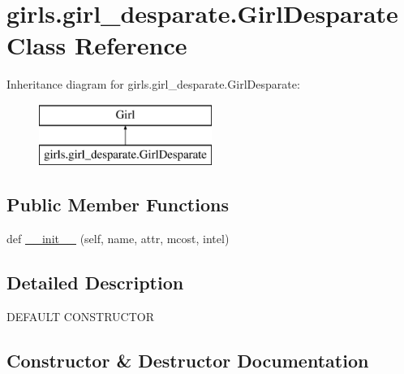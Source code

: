 \hypertarget{classgirls_1_1girl__desparate_1_1_girl_desparate}{}\section{girls.\+girl\+\_\+desparate.\+Girl\+Desparate Class Reference}
\label{classgirls_1_1girl__desparate_1_1_girl_desparate}
Inheritance diagram for girls.\+girl\+\_\+desparate.\+Girl\+Desparate\+:\begin{figure}[H]
\begin{center}
\leavevmode
\includegraphics[height=2.000000cm]{classgirls_1_1girl__desparate_1_1_girl_desparate}
\end{center}
\end{figure}
\subsection*{Public Member Functions}
\begin{DoxyCompactItemize}
\item 
def \hyperlink{classgirls_1_1girl__desparate_1_1_girl_desparate_a5c97b4f8b1c27fd7ed3c9ed8d3b6113c}{\+\_\+\+\_\+init\+\_\+\+\_\+} (self, name, attr, mcost, intel)
\end{DoxyCompactItemize}


\subsection{Detailed Description}
\begin{DoxyVerb}DEFAULT CONSTRUCTOR\end{DoxyVerb}
 

\subsection{Constructor \& Destructor Documentation}
